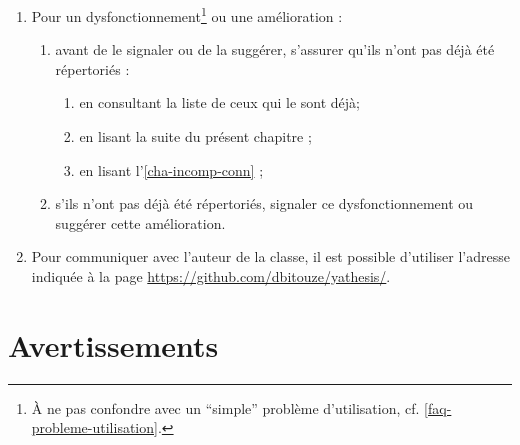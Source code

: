 \begin{enumerate}
\item Pour un dysfonctionnement\footnote{À ne pas confondre avec un
    \enquote{simple} problème d'utilisation,
    cf. \vref{faq-probleme-utilisation}.}  ou une amélioration :
  \begin{enumerate}
  \item avant de le signaler ou de la suggérer, s'assurer qu'ils n'ont pas déjà
    été répertoriés :
    \begin{enumerate}
    \item en consultant la liste de ceux qui le sont déjà\issues ;
    \item en lisant la suite du présent chapitre ;
    \item en lisant l'\vref{cha-incomp-conn} ;
    \end{enumerate}
  \item s'ils n'ont pas déjà été répertoriés, signaler ce
    dysfonctionnement\ecm{} ou suggérer cette amélioration\newissues{}.
  \end{enumerate}
\item Pour communiquer avec l'auteur de la classe, il est possible d'utiliser
  l'adresse indiquée à la page \url{https://github.com/dbitouze/yathesis/}.
\end{enumerate}

\section{Avertissements}
\label{sec-avertissements}

